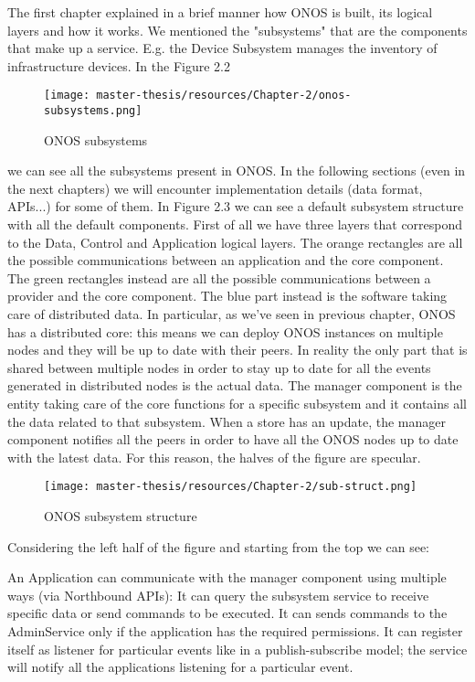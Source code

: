 \documentclass[a4paper,10pt]{memoir}
\begin{document}
The first chapter explained in a brief manner how ONOS is built, its logical layers and how it works. We mentioned the "subsystems" that are the components that make up a service. E.g. the Device Subsystem manages the inventory of infrastructure devices. In the Figure 2.2
\begin{figure}[h]
\caption{ONOS subsystems}
\label{fig:subsystem}
\texttt{[image: master-thesis/resources/Chapter-2/onos-subsystems.png]}
\centering
\end{figure}
we can see all the subsystems present in ONOS. In the following sections (even in the next chapters) we will encounter implementation details (data format, APIs...) for some of them. In Figure 2.3 we can see a default subsystem structure with all the default components. First of all we have three layers that correspond to the Data, Control and Application logical layers. The orange rectangles are all the possible communications between an application and the core component. The green rectangles instead are all the possible communications between a provider and the core component. The blue part instead is the software taking care of distributed data. In particular, as we've seen in previous chapter, ONOS has a distributed core: this means we can deploy ONOS instances on multiple nodes and they will be up to date with their peers. In reality the only part that is shared between multiple nodes in order to stay up to date for all the events generated in distributed nodes is the actual data. The manager component is the entity taking care of the core functions for a specific subsystem and it contains all the data related to that subsystem. When a store has an update, the manager component notifies all the peers in order to have all the ONOS nodes up to date with the latest data. For this reason, the halves of the figure are specular. 
\begin{figure}[h]
\caption{ONOS subsystem structure}
\label{fig:subsystem-struct}
\texttt{[image: master-thesis/resources/Chapter-2/sub-struct.png]}
\centering
\end{figure}
Considering the left half of the figure and starting from the top we can see: 

An Application can communicate with the manager component using multiple ways (via Northbound APIs): It can query the subsystem service to receive specific data or send commands to be executed. It can sends commands to the AdminService only if the application has the required permissions. It can register itself as listener for particular events like in a publish-subscribe model; the service will notify all the applications listening for a particular event.
\end{document}
